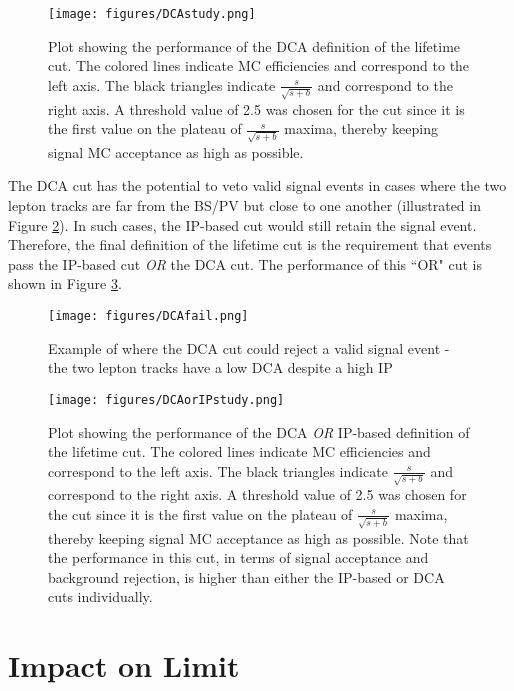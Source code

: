 \begin{figure}[tbh!]
\centering
\texttt{[image: figures/DCAstudy.png]}
\caption{Plot showing the performance of the DCA definition of the lifetime cut. The colored lines indicate MC efficiencies and correspond to the left axis. The black triangles indicate $\frac{s}{\sqrt{s+b}}$ and correspond to the right axis. A threshold value of 2.5 was chosen for the cut since it is the first value on the plateau of $\frac{s}{\sqrt{s+b}}$ maxima, thereby keeping signal MC acceptance as high as possible.}
\label{fig:DCAstudy}
\end{figure}

The DCA cut has the potential to veto valid signal events in cases where the two lepton tracks are far from the BS/PV but close to one another (illustrated in Figure \ref{fig:DCAfail}). In such cases, the IP-based cut would still retain the signal event. Therefore, the final definition of the lifetime cut is the requirement that events pass the IP-based cut \emph{OR} the DCA cut. The performance of this ``OR" cut is shown in Figure \ref{fig:DCAorIPstudy}.

\begin{figure}[tbh!]
\centering
\texttt{[image: figures/DCAfail.png]}
\caption{Example of where the DCA cut could reject a valid signal event - the two lepton tracks have a low DCA despite a high IP}
\label{fig:DCAfail}
\end{figure}

\begin{figure}[tbh!]
\centering
\texttt{[image: figures/DCAorIPstudy.png]}
\caption{Plot showing the performance of the DCA \emph{OR} IP-based definition of the lifetime cut. The colored lines indicate MC efficiencies and correspond to the left axis. The black triangles indicate $\frac{s}{\sqrt{s+b}}$ and correspond to the right axis. A threshold value of 2.5 was chosen for the cut since it is the first value on the plateau of $\frac{s}{\sqrt{s+b}}$ maxima, thereby keeping signal MC acceptance as high as possible. Note that the performance in this cut, in terms of signal acceptance and background rejection, is higher than either the IP-based or DCA cuts individually.}
\label{fig:DCAorIPstudy}
\end{figure}

\section{Impact on Limit}
